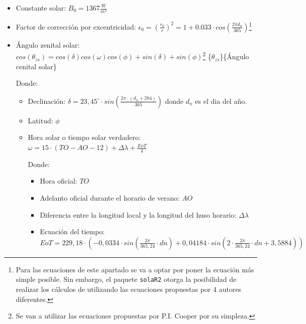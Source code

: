 \begin{itemize}
\item Constante solar: \(B_0=1367\frac{W}{m^2}\) 
\item Factor de corrección por excentricidad: \(\epsilon_0=(\frac{r_0}{r})^2=1+0.033\cdot cos(\frac{2\pi d_n}{365})\)\footnote{Para las ecuaciones de este apartado se va a optar por poner la ecuación más simple posible. Sin embargo, el paquete \texttt{solaR2} otorga la posibilidad de realizar los cálculos de utilizando las ecuaciones propuestas por 4 autores diferentes.} 
\item Ángulo zenital solar: \(cos(\theta_{zs})=cos(\delta)cos(\omega)cos(\phi)+sin(\delta)+sin(\phi)\)\footnote{Se van a utilizar las ecuaciones propuestas por P.I. Cooper \cite{Cooper1969} por su simpleza.} \nomenclature[thetazs]\{\(\theta_{zs}\)\}\{Ángulo cenital solar\}

Donde:
\begin{itemize}
\item Declinación: \(\delta =23,45^\circ \cdot sin(\frac{2\pi \cdot (d_n+284)}{365})\) 
donde \(d_n\) es el dia del año. 
\item Latitud: \(\phi\) 
\item Hora solar o tiempo solar verdadero: \(\omega = 15\cdot (TO-AO-12)+\Delta \lambda +\frac{EoT}{4}\) 

Donde:
\begin{itemize}
\item Hora oficial: \(TO\) 
\item Adelanto oficial durante el horario de verano: \(AO\) 
\item Diferencia entre la longitud local y la longitud del huso horario: \(\Delta \lambda\) 
\item Ecuación del tiempo: \(EoT=229,18\cdot (-0,0334\cdot sin(\frac{2\pi}{365,24}\cdot dn)+0,04184\cdot sin(2\cdot \frac{2\pi}{365,24}\cdot dn+3,5884))\) 
\end{itemize}
\end{itemize}
\end{itemize}

